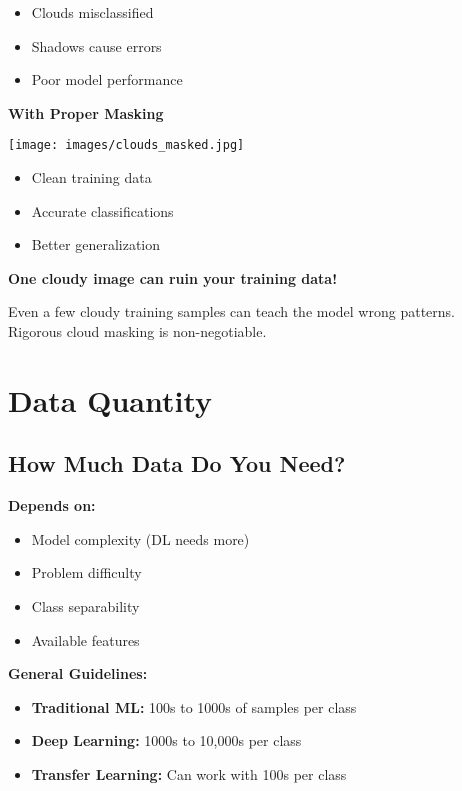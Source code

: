 \documentclass[
  letterpaper,
  DIV=11,
  numbers=noendperiod]{scrartcl}
\providecommand{\tightlist}{%
  \setlength{\itemsep}{0pt}\setlength{\parskip}{0pt}}
\begin{document}
\begin{itemize}
\tightlist
\item
  Clouds misclassified
\item
  Shadows cause errors
\item
  Poor model performance
\end{itemize}

\textbf{With Proper Masking}

\texttt{[image: images/clouds\_masked.jpg]}

\begin{itemize}
\tightlist
\item
  Clean training data
\item
  Accurate classifications
\item
  Better generalization
\end{itemize}

\textbf{One cloudy image can ruin your training data!}

Even a few cloudy training samples can teach the model wrong patterns.
Rigorous cloud masking is non-negotiable.

\section{Data Quantity}\label{data-quantity}

\subsection{How Much Data Do You Need?}\label{how-much-data-do-you-need}

\textbf{Depends on:}

\begin{itemize}
\tightlist
\item
  Model complexity (DL needs more)
\item
  Problem difficulty
\item
  Class separability
\item
  Available features
\end{itemize}

\textbf{General Guidelines:}

\begin{itemize}
\tightlist
\item
  \textbf{Traditional ML:} 100s to 1000s of samples per class
\item
  \textbf{Deep Learning:} 1000s to 10,000s per class
\item
  \textbf{Transfer Learning:} Can work with 100s per class
\end{itemize}
\end{document}
